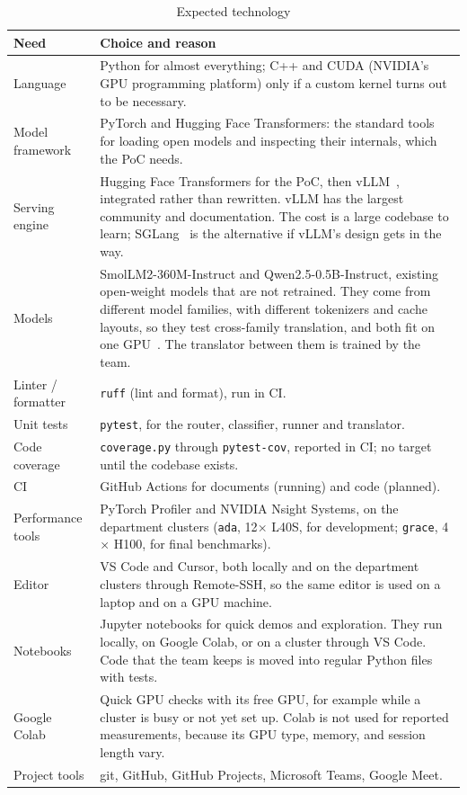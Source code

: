 \documentclass{article}
\begin{document}
\begin{table}[H]
\caption{Expected technology} \label{TblTech}
\begin{tabularx}{\textwidth}{lX}
\toprule
\textbf{Need} & \textbf{Choice and reason}\\
\midrule
Language & Python for almost everything; C++ and CUDA (NVIDIA's GPU programming
platform) only if a custom kernel
turns out to be necessary.\\
Model framework & PyTorch and Hugging Face Transformers: the standard
tools for loading open models and inspecting their internals, which the
PoC needs.\\
Serving engine & Hugging Face Transformers for the PoC, then
vLLM~\cite{Kwon2023vLLM}, integrated rather than rewritten. vLLM has the
largest community and documentation. The cost is a large codebase to learn;
SGLang~\cite{Zheng2024SGLang} is the alternative if vLLM's design gets in
the way.\\
Models & SmolLM2-360M-Instruct and Qwen2.5-0.5B-Instruct, existing
open-weight models that are not retrained. They come from different model
families, with different tokenizers and cache layouts, so they test
cross-family translation, and both fit on one GPU~\cite{TandemMLReport}.
The translator between them is trained by the team.\\
Linter / formatter & \texttt{ruff} (lint and format), run in CI.\\
Unit tests & \texttt{pytest}, for the router, classifier, runner and
translator.\\
Code coverage & \texttt{coverage.py} through \texttt{pytest-cov}, reported
in CI; no target until the codebase exists.\\
CI & GitHub Actions for documents (running) and code (planned).\\
Performance tools & PyTorch Profiler and NVIDIA Nsight Systems, on the
department clusters (\texttt{ada}, 12$\times$ L40S, for development;
\texttt{grace}, 4$\times$ H100, for final benchmarks).\\
Editor & VS Code and Cursor, both locally and on the department clusters
through Remote-SSH, so the same editor is used on a laptop and on a GPU
machine.\\
Notebooks & Jupyter notebooks for quick demos and exploration. They run
locally, on Google Colab, or on a cluster through VS Code. Code that the
team keeps is moved into regular Python files with tests.\\
Google Colab & Quick GPU checks with its free GPU, for example while a
cluster is busy or not yet set up. Colab is not used for reported
measurements, because its GPU type, memory, and session length vary.\\
Project tools & git, GitHub, GitHub Projects, Microsoft Teams, Google
Meet.\\
\bottomrule
\end{tabularx}
\end{table}
\end{document}
